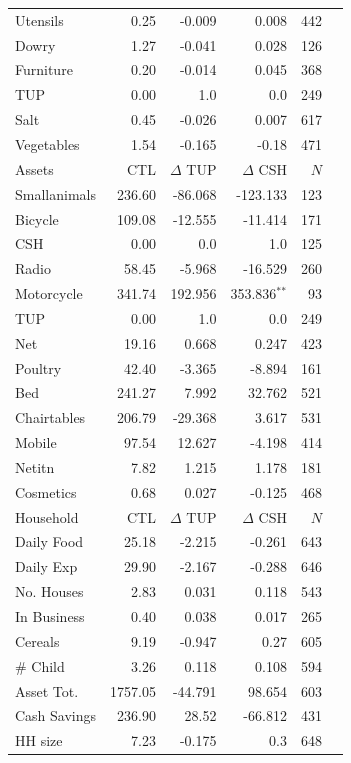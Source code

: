 \documentclass[12pt,article]{article}
\begin{document}
\begin{longtable}{lrrrrr}
Utensils & 0.25 & -0.009 & 0.008 & 442\\
Dowry & 1.27 & -0.041 & 0.028 & 126\\
Furniture & 0.20 & -0.014 & 0.045 & 368\\
TUP & 0.00 & 1.0 & 0.0 & 249\\
Salt & 0.45 & -0.026 & 0.007 & 617\\
Vegetables & 1.54 & -0.165 & -0.18 & 471\\
\hline
Assets & CTL & $\Delta$ TUP & $\Delta$ CSH & $N$\\
\hline
Smallanimals & 236.60 & -86.068 & -123.133 & 123\\
Bicycle & 109.08 & -12.555 & -11.414 & 171\\
CSH & 0.00 & 0.0 & 1.0 & 125\\
Radio & 58.45 & -5.968 & -16.529 & 260\\
Motorcycle & 341.74 & 192.956 & 353.836$^{\text{**}}$ & 93\\
TUP & 0.00 & 1.0 & 0.0 & 249\\
Net & 19.16 & 0.668 & 0.247 & 423\\
Poultry & 42.40 & -3.365 & -8.894 & 161\\
Bed & 241.27 & 7.992 & 32.762 & 521\\
Chairtables & 206.79 & -29.368 & 3.617 & 531\\
Mobile & 97.54 & 12.627 & -4.198 & 414\\
Netitn & 7.82 & 1.215 & 1.178 & 181\\
Cosmetics & 0.68 & 0.027 & -0.125 & 468\\
\hline
Household & CTL & $\Delta$ TUP & $\Delta$ CSH & $N$\\
\hline
Daily Food & 25.18 & -2.215 & -0.261 & 643\\
Daily Exp & 29.90 & -2.167 & -0.288 & 646\\
No. Houses & 2.83 & 0.031 & 0.118 & 543\\
In Business & 0.40 & 0.038 & 0.017 & 265\\
Cereals & 9.19 & -0.947 & 0.27 & 605\\
\# Child & 3.26 & 0.118 & 0.108 & 594\\
Asset Tot. & 1757.05 & -44.791 & 98.654 & 603\\
Cash Savings & 236.90 & 28.52 & -66.812 & 431\\
HH size & 7.23 & -0.175 & 0.3 & 648\\
\hline
\end{longtable}
\end{document}
